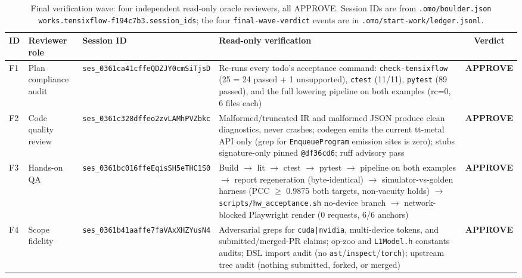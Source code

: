 \begin{table}[t]
  \centering
  \footnotesize
  \caption{Final verification wave: four independent read-only oracle
    reviewers, all APPROVE. Session IDs are from
    \texttt{.omo/boulder.json} \texttt{works.tensixflow-f194c7b3.session\_ids};
    the four \texttt{final-wave-verdict} events are in
    \texttt{.omo/start-work/ledger.jsonl}.}
  \label{tab:orch-finalwave}
  \begin{tabular}{@{}p{0.5cm}p{2.0cm}p{4.6cm}p{5.6cm}c@{}}
    \toprule
    \textbf{ID} & \textbf{Reviewer role} & \textbf{Session ID} & \textbf{Read-only verification} & \textbf{Verdict} \\
    \midrule
    F1 & Plan compliance audit &
      \texttt{\scriptsize ses\_0361ca41cffeQDZJY0cmSiTjsD} &
      Re-runs every todo's acceptance command: \texttt{check-tensixflow}
      (25 = 24 passed + 1 unsupported), \texttt{ctest} (11/11),
      \texttt{pytest} (89 passed), and the full lowering pipeline on both
      examples (rc=0, 6 files each) &
      \textbf{APPROVE} \\
    F2 & Code quality review &
      \texttt{\scriptsize ses\_0361c328dffeo2zvLAMhPVZbkc} &
      Malformed/truncated IR and malformed JSON produce clean diagnostics,
      never crashes; codegen emits the current tt-metal API only (grep for
      \texttt{EnqueueProgram} emission sites is zero); stubs signature-only
      pinned \texttt{@df36cd6}; ruff advisory pass &
      \textbf{APPROVE} \\
    F3 & Hands-on QA &
      \texttt{\scriptsize ses\_0361bc016ffeEqisSH5eTHC1S0} &
      Build $\to$ lit $\to$ ctest $\to$ pytest $\to$ pipeline on both
      examples $\to$ report regeneration (byte-identical) $\to$
      simulator-vs-golden harness (PCC $\ge$ 0.9875 both targets, non-vacuity
      holds) $\to$ \texttt{scripts/hw\_acceptance.sh} no-device branch $\to$
      network-blocked Playwright render (0 requests, 6/6 anchors) &
      \textbf{APPROVE} \\
    F4 & Scope fidelity &
      \texttt{\scriptsize ses\_0361b41aaffe7faVAxXHZYusN4} &
      Adversarial greps for \texttt{cuda|nvidia}, multi-device tokens, and
      submitted/merged-PR claims; op-zoo and \texttt{L1Model.h} constants
      audits; DSL import audit (no \texttt{ast}/\texttt{inspect}/\texttt{torch});
      upstream tree audit (nothing submitted, forked, or merged) &
      \textbf{APPROVE} \\
    \bottomrule
  \end{tabular}
\end{table}

